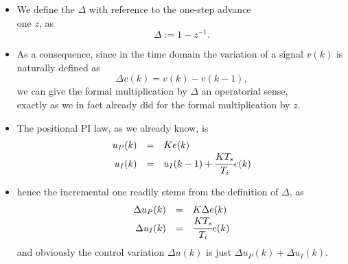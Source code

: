 \begin{frame}
\myPause
 \begin{itemize}[<+-| alert@+>]
 \item We define the  $\Delta$ with reference to the one-step advance\\
       one $z$, as
       \begin{displaymath}
        \Delta := 1-z^{-1}.
       \end{displaymath}
 \item As a consequence, since in the time domain the variation of a signal $v(k)$
       is naturally defined as
       \begin{displaymath}
        \Delta v(k) = v(k)-v(k-1),
       \end{displaymath}
       we can give the formal multiplication by $\Delta$ an operatorial sense,\\
       exactly as we in fact already did for the formal multiplication by $z$. 
 \end{itemize}
\end{frame}


\begin{frame}
\myPause
 \begin{itemize}[<+-| alert@+>]
 \item The positional PI law, as we already know, is
       \begin{displaymath}
        \begin{array}{rcl}
         u_P(k) &=& K e(k) \\
         u_I(k) &=& u_I(k-1) + \cfrac{KT_s}{T_i} e(k)
        \end{array}
       \end{displaymath}
 \item hence the incremental one readily stems from the definition of $\Delta$, as
       \begin{displaymath}
        \begin{array}{rcl}
         \Delta u_P(k) &=& K \Delta e(k) \\
         \Delta u_I(k) &=& \cfrac{KT_s}{T_i} e(k)
        \end{array}
       \end{displaymath}
       and obviously the control variation $\Delta u(k)$ is just $\Delta u_P(k)+\Delta u_I(k)$.
 \end{itemize}
\end{frame}

